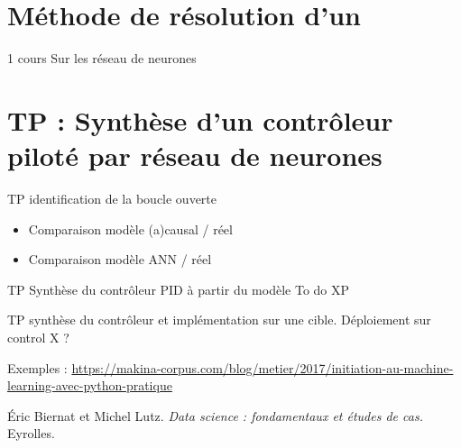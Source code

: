 \section{Méthode de résolution d'un }

\newpage


1 cours Sur les réseau de neurones

\section{TP : Synthèse d'un contrôleur piloté par réseau de neurones}

TP identification de la boucle ouverte  
\begin{itemize}
\item Comparaison modèle (a)causal / réel
\item Comparaison modèle ANN / réel
\end{itemize}


TP Synthèse du contrôleur PID 
à partir du modèle
To do XP

TP synthèse du contrôleur et implémentation sur une cible. 
Déploiement sur control X ?



\newpage


\newpage

Exemples : 
\url{https://makina-corpus.com/blog/metier/2017/initiation-au-machine-learning-avec-python-pratique}

\begin{thebibliography}{2}
    Éric Biernat et Michel Lutz. {\it Data science : fondamentaux et études de cas.} Eyrolles.
\end{thebibliography}

